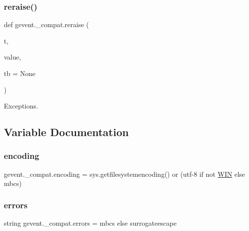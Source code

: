 \subsubsection{\texorpdfstring{reraise()}{reraise()}}
{\footnotesize\ttfamily def gevent.\+\_\+compat.\+reraise (\begin{DoxyParamCaption}\item[{}]{t,  }\item[{}]{value,  }\item[{}]{tb = {\ttfamily None} }\end{DoxyParamCaption})}



Exceptions. 



\subsection{Variable Documentation}
\mbox{\label{namespacegevent_1_1__compat_a19f76a3ed005a53efa7c1b355bc6924d}} 
\subsubsection{\texorpdfstring{encoding}{encoding}}
{\footnotesize\ttfamily gevent.\+\_\+compat.\+encoding = sys.\+getfilesystemencoding() or (\textquotesingle{}utf-\/8\textquotesingle{} if not \hyperlink{namespacegevent_1_1__compat_a887be9cbf2ddbbf113adcdec314f4438}{W\+IN} else \textquotesingle{}mbcs\textquotesingle{})}

\mbox{\label{namespacegevent_1_1__compat_aead37f1bc4f22b4a2fd7ebc324289618}} 
\subsubsection{\texorpdfstring{errors}{errors}}
{\footnotesize\ttfamily string gevent.\+\_\+compat.\+errors = \textquotesingle{}mbcs\textquotesingle{} else \textquotesingle{}surrogateescape\textquotesingle{}}

\mbox{\label{namespacegevent_1_1__compat_a0ad83ad0e9d4f7dfc80dc8b7d880429b}} 
